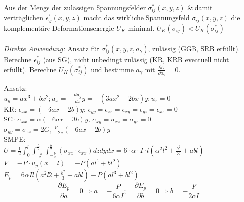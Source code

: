 \documentclass[a4paper,10pt]{article}
\begin{document}
\begin{multicols*}{3}
            Aus der Menge der zulässigen Spannungsfelder $\sigma_{ij}^*(x,y,z)$ \& damit verträglichen $\epsilon_{ij}^*(x,y,z)$ macht das wirkliche Spannungsfeld $\sigma_{ij}(x,y,z)$ die komplementäre Deformationsenergie $U_K$ minimal. $U_K(\sigma_{ij}) < U_K(\sigma_{ij}^*)$\\\\
            \textit{Direkte Anwendung:} Ansatz für $\sigma_{ij}^*(x,y,z,a_\gamma)$, zulässig (GGB, SRB erfüllt). Berechne $\epsilon_{ij}^*$ (aus SG), nicht unbedingt zulässig (KR, KRB eventuell nicht erfüllt). Berechne $U_K(\sigma_{ij}^*)$ und bestimme $a_\gamma$ mit $\frac{\partial U}{\partial a_\gamma}=0$.
            
            Ansatz:\\
            $u_y=ax^3+bx^2; u_x=-\frac{du_y}{dx}y= -(3ax^2+2bx)y; u_z = 0$\\
            KR: $\epsilon_{xx} =(-6ax-2b)y$; $\epsilon_{yy}=\epsilon_{zz}=\epsilon_{xy}=\epsilon_{yz} = \epsilon_{xz}=0$\\
            SG: $\sigma_{xx} = \alpha(-6ax-3b)y$, $\sigma_{xy}=\sigma_{xz}=\sigma_{yz}=0$\\ $\sigma_{yy}=\sigma_{zz}=2G\frac{\nu}{1-2\nu}(-6ax-2b)y$\\
            SMPE:\\
            $U=\frac{1}{2}\int_0^l\int_\frac{-h}{2}^\frac{h}{2}\int_{-\frac{b}{2}}^\frac{b}{2}(\sigma_{xx}\cdot\epsilon_{xx})dzdydx=6\cdot\alpha\cdot I\cdot l(\alpha^2l^2+\frac{b^2}{3}+abl)$\\
            $V=-P\cdot u_y(x=l)=-P(al^3+bl^2)$\\
            $E_p=6\alpha Il(a^2l2+\frac{b^2}{3}+abl)-P(al^3+bl^2)$
            \[\frac{\partial E_p}{\partial a} = 0 \Rightarrow a=-\frac{P}{6\alpha I};\quad\frac{\partial E_p}{\partial b} = 0 \Rightarrow b=-\frac{P}{2\alpha I}\]
            \columnbreak
            

\end{multicols*}
\end{document}
